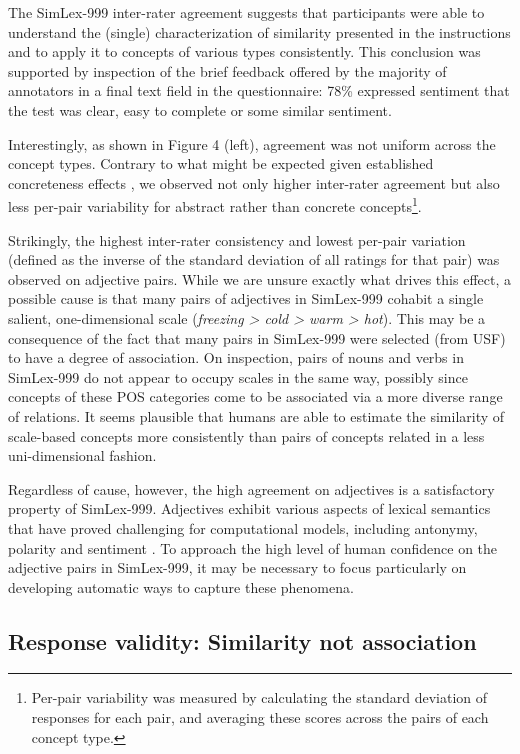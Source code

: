 The SimLex-999 inter-rater agreement suggests that participants were able to understand the (single) characterization of similarity presented in the instructions and to apply it to concepts of various types consistently. This conclusion was supported by inspection of the brief feedback offered by the majority of annotators in a final text field in the questionnaire: 78\% expressed sentiment that the test was clear, easy to complete or some similar sentiment.

Interestingly, as shown in Figure 4 (left), agreement was not uniform across the concept types. Contrary to what might be expected given established concreteness effects \cite{paivio1991dual}, we observed not only higher inter-rater agreement but also less per-pair variability for abstract rather than concrete concepts\footnote{Per-pair variability was measured by calculating the standard deviation of responses for each pair, and averaging these scores across the pairs of each concept type.}. 

Strikingly, the highest inter-rater consistency and lowest per-pair variation (defined as the inverse of the standard deviation of all ratings for that pair) was observed on adjective pairs. While we are unsure exactly what drives this effect, a possible cause is that many pairs of adjectives in SimLex-999 cohabit a single salient, one-dimensional scale (\emph{freezing > cold > warm > hot}). This may be a consequence of the fact that many pairs in SimLex-999 were selected (from USF) to have a degree of association. On inspection, pairs of nouns and verbs in SimLex-999 do not appear to occupy scales in the same way, possibly since concepts of these POS categories come to be associated via a more diverse range of relations. It seems plausible that humans are able to estimate the similarity of scale-based concepts more consistently than pairs of concepts related in a less uni-dimensional fashion. 

Regardless of cause, however, the high agreement on adjectives is a satisfactory property of SimLex-999. Adjectives exhibit various aspects of lexical semantics that have proved challenging for computational models, including antonymy, polarity \cite{williams2009predicting} and sentiment \cite{wiebe2000learning}. To approach the high level of human confidence on the adjective pairs in SimLex-999, it may be necessary to focus particularly on developing automatic ways to capture these phenomena. 

\subsection{Response validity: Similarity not association}	



